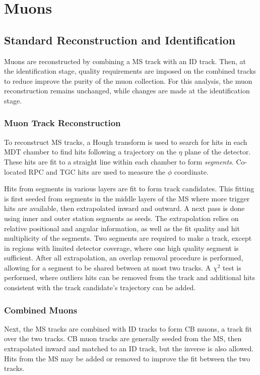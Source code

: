 \section{Muons}
\label{sec:muonreco}
\subsection{Standard Reconstruction and Identification}

Muons are reconstructed by combining a \ac{MS} track with an \ac{ID} track. Then, at the identification stage, quality requirements are imposed on the combined tracks to reduce improve the purity of the muon collection. For this analysis, the muon reconstruction remains unchanged, while changes are made at the identification stage.

\subsubsection{Muon Track Reconstruction}
To reconstruct \ac{MS} tracks, a Hough transform is used to search for hits in each \ac{MDT} chamber to find hits following a trajectory on the $\eta$ plane of the detector. These hits are fit to a straight line within each chamber to form \emph{segments}. Co-located \ac{RPC} and \ac{TGC} hits are used to measure the $\phi$ coordinate. 

Hits from segments in various layers are fit to form track candidates. This fitting is first seeded from segments in the middle layers of the \ac{MS} where more trigger hits are available, then extrapolated inward and outward. A next pass is done using inner and outer station segments as seeds. The extrapolation relies on relative positional and angular information, as well as the fit quality and hit multiplicity of the segments. Two segments are required to make a track, except in regions with limited detector coverage, where one high quality segment is sufficient. After all extrapolation, an overlap removal procedure is performed, allowing for a segment to be shared between at most two tracks. A $\chi^{2}$ test is performed, where outliers hits can be removed from the track and additional hits consistent with the track candidate's trajectory can be added.

\subsubsection{Combined Muons}
Next, the \ac{MS} tracks are combined with \ac{ID} tracks to form \ac{CB} muons, a track fit over the two tracks. \ac{CB} muon tracks are generally seeded from the \ac{MS}, then extrapolated inward and matched to an \ac{ID} track, but the inverse is also allowed. Hits from the \ac{MS} may be added or removed to improve the fit between the two tracks.


